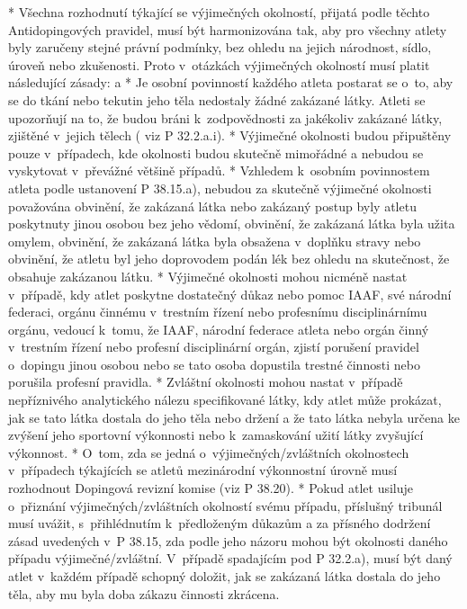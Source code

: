* Všechna rozhodnutí týkající se výjimečných okolností, přijatá podle těchto Antidopingových pravidel, musí být harmonizována tak, aby pro všechny atlety byly zaručeny stejné právní podmínky, bez ohledu na jejich národnost, sídlo, úroveň nebo zkušenosti. Proto v~otázkách výjimečných okolností musí platit následující zásady:
  \begitems \style a
  * Je osobní povinností každého atleta postarat se o~to, aby se do tkání nebo tekutin jeho těla nedostaly žádné zakázané látky. Atleti se upozorňují na to, že budou bráni k~zodpovědnosti za jakékoliv zakázané látky, zjištěné v~jejich tělech ( viz P 32.2.a.i).
  * Výjimečné okolnosti budou připuštěny pouze v~případech, kde okolnosti budou skutečně mimořádné a nebudou se vyskytovat v~převážné většině případů.
  * Vzhledem k~osobním povinnostem atleta podle ustanovení P 38.15.a), nebudou za skutečně výjimečné okolnosti považována obvinění, že zakázaná látka nebo zakázaný postup byly atletu poskytnuty jinou osobou bez jeho vědomí, obvinění, že zakázaná látka byla užita omylem, obvinění, že zakázaná látka byla obsažena v~doplňku stravy nebo obvinění, že atletu byl jeho doprovodem podán lék bez ohledu na skutečnost, že obsahuje zakázanou látku.
  * Výjimečné okolnosti mohou nicméně nastat v~případě, kdy atlet poskytne dostatečný důkaz nebo pomoc IAAF, své národní federaci, orgánu činnému v~trestním řízení nebo profesnímu disciplinárnímu orgánu, vedoucí k~tomu, že IAAF, národní federace atleta nebo orgán činný v~trestním řízení nebo profesní disciplinární orgán, zjistí porušení pravidel o~dopingu jinou osobou nebo se tato osoba dopustila trestné činnosti nebo porušila profesní pravidla.
  * Zvláštní okolnosti mohou nastat v~případě nepříznivého analytického nálezu specifikované látky, kdy atlet může prokázat, jak se tato látka dostala do jeho těla nebo držení a že tato látka nebyla určena ke zvýšení jeho sportovní výkonnosti nebo k~zamaskování užití látky zvyšující výkonnost.
  \enditems
* O~tom, zda se jedná o~výjimečných/zvláštních okolnostech v~případech týkajících se atletů mezinárodní výkonnostní úrovně musí rozhodnout Dopingová revizní komise (viz P 38.20).
* Pokud atlet usiluje o~přiznání výjimečných/zvláštních okolností svému případu, příslušný tribunál musí uvážit, s~přihlédnutím k~předloženým důkazům a za přísného dodržení zásad uvedených v~P 38.15, zda podle jeho názoru mohou být okolnosti daného případu výjimečné/zvláštní. V~případě spadajícím pod P 32.2.a), musí být daný atlet v~každém případě schopný doložit, jak se zakázaná látka dostala do jeho těla, aby mu byla doba zákazu činnosti zkrácena.
